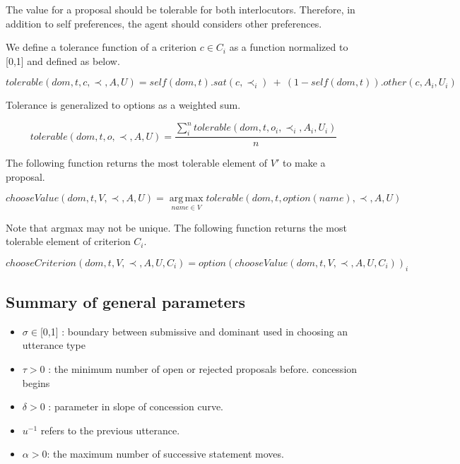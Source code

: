 \documentclass{llncs}
\begin{document}
				The value for a proposal should be tolerable for both interlocutors. Therefore,  in addition to self preferences, the agent should considers other preferences. 
				
				We define a tolerance function of a criterion $c \in C_i$ as a function normalized to [0,1] and defined as below.
				
				$$tolerable(dom, t, c, \prec, A, U) = self(dom, t) . sat(c, \prec_i) \ +\  (1 - self(dom, t)) . other(c, A_i, U_i)$$
				
				Tolerance is generalized to options as a weighted sum.
				
				$$tolerable(dom, t, o, \prec, A, U) = \frac{ \sum_{i}^{n} tolerable(dom, t, o_i, \prec_i, A_i, U_i) } {n}$$ 
				
				
				
				The following function returns the most tolerable element of $V'$ to make a proposal.
				
				$$ chooseValue(dom, t, V, \prec, A, U) =	\operatorname*{arg\,max}_{name \in V} tolerable(dom, t, option(name), \prec, A, U) $$
				
				Note that argmax may not be unique.  The following function returns the most tolerable element of	criterion $C_i$.
				
				$$chooseCriterion(dom, t, V, \prec, A, U, C_i) = option(chooseValue(dom, t, V, \prec, A, U, C_i))_i$$
				
				
				
				
				\subsection{Summary of general parameters }
				\begin{itemize}
					
					\item $\sigma \in $[0,1] : boundary between submissive and dominant used in
					choosing an utterance type
					\item $\tau > 0$ : the minimum number of open or rejected proposals before.
					concession begins
					\item $\delta > 0$ : parameter in slope of concession curve.
					\item $u^{-1}$ refers to the previous utterance.
					\item $\alpha> 0$: the maximum number of successive statement moves.
					
					
				\end{itemize}
				
\end{document}
